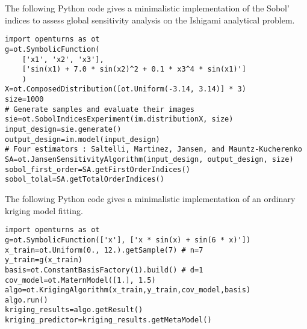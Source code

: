 \begin{otexample}
    The following Python code gives a minimalistic \ot implementation of the Sobol' indices to assess global sensitivity analysis on the Ishigami analytical problem. 
    \lstset{style=mystyle, language=python}
%
\begin{lstlisting}
import openturns as ot
g=ot.SymbolicFunction(
    ['x1', 'x2', 'x3'], 
    ['sin(x1) + 7.0 * sin(x2)^2 + 0.1 * x3^4 * sin(x1)']
    )
X=ot.ComposedDistribution([ot.Uniform(-3.14, 3.14)] * 3)
size=1000
# Generate samples and evaluate their images
sie=ot.SobolIndicesExperiment(im.distributionX, size)
input_design=sie.generate()
output_design=im.model(input_design)
# Four estimators : Saltelli, Martinez, Jansen, and Mauntz-Kucherenko
SA=ot.JansenSensitivityAlgorithm(input_design, output_design, size)
sobol_first_order=SA.getFirstOrderIndices()
sobol_tolal=SA.getTotalOrderIndices()
\end{lstlisting}
%
\end{otexample}



\begin{otexample}
    The following Python code gives a minimalistic \ot implementation of an ordinary kriging model fitting. 
    \lstset{style=mystyle, language=python}
%
\begin{lstlisting}
import openturns as ot
g=ot.SymbolicFunction(['x'], ['x * sin(x) + sin(6 * x)'])
x_train=ot.Uniform(0., 12.).getSample(7) # n=7
y_train=g(x_train)
basis=ot.ConstantBasisFactory(1).build() # d=1
cov_model=ot.MaternModel([1.], 1.5)
algo=ot.KrigingAlgorithm(x_train,y_train,cov_model,basis)
algo.run()
kriging_results=algo.getResult()
kriging_predictor=kriging_results.getMetaModel()
\end{lstlisting}
%
\end{otexample}

